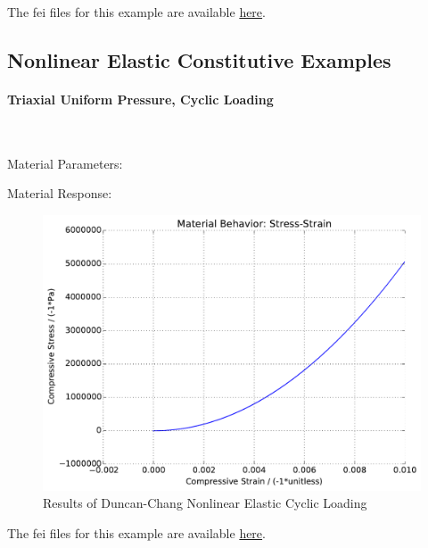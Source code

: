 \documentclass[fleqn,11pt]{article}
\begin{document}
The fei files for this example are available \href{https://github.com/yuan-energy/education_examples/tree/master/fei_examples/duncan_chang_nonlinear_elasticity/1triaxial_uniform_mono_loading}{here}.

\newpage
\subsection{Nonlinear Elastic Constitutive Examples}

\paragraph{Triaxial Uniform Pressure, Cyclic Loading} ~

Material Parameters:


Material Response:
\begin{figure}[H]
\begin{center}
\includegraphics[width=12cm]{../fei_examples/duncan_chang_nonlinear_elasticity/2triaxial_uniform_cyclic_loading/result.pdf}
\caption{
\label{Res_triaxial_nonlinear_elastic_cyclic}
Results of Duncan-Chang Nonlinear Elastic Cyclic Loading}
\end{center}
\end{figure}

The fei files for this example are available \href{https://github.com/yuan-energy/education_examples/tree/master/fei_examples/duncan_chang_nonlinear_elasticity/2triaxial_uniform_cyclic_loading}{here}.
\end{document}
